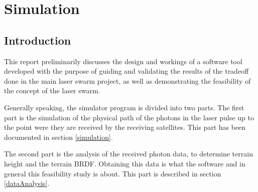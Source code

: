 \chapter{Simulation}
\label{sim}
\section{Introduction}
\label{simIntro}
This report preliminarily discusses the design and workings of a software tool developed with the purpose of guiding and validating the results of the tradeoff done in the main laser swarm project, as well as demonstrating the feasibility of the concept of the laser swarm.

Generally speaking, the simulator program is divided into two parts. The first part is the simulation of the physical path of the photons in the laser pulse up to the point were they are received by the receiving satellites. This part has been documented in section \ref{simulation}.

The second part is the analysis of the received photon data, to determine terrain height and the terrain \ac{BRDF}. Obtaining this data is what the software and in general this feasibility study is about. This part is described in section \ref{dataAnalysis}.


